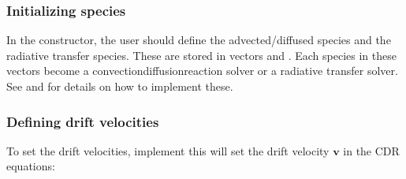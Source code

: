 \documentclass[letterpaper,10pt,english]{sphinxmanual}
\begin{document}
\subsubsection{Initializing species}
\label{\detokenize{Applications/CdrPlasmaModel:initializing-species}}
\sphinxAtStartPar
In the constructor, the user should define the advected/diffused species and the radiative transfer species.
These are stored in vectors  and .
Each species in these vectors become a convection\sphinxhyphen{}diffusion\sphinxhyphen{}reaction solver or a radiative transfer solver.
See {\hyperref[\detokenize{Solvers/CDR:chap-cdrspecies}]{}} and {\hyperref[\detokenize{Solvers/RTE:chap-rtspecies}]{}} for details on how to implement these.


\subsubsection{Defining drift velocities}
\label{\detokenize{Applications/CdrPlasmaModel:defining-drift-velocities}}
\sphinxAtStartPar
To set the drift velocities, implement  \textendash{} this will set the drift velocity \(\mathbf{v}\) in the CDR equations:

\begin{sphinxVerbatim}[commandchars=\\\{\},formatcom=\scriptsize]
           
                                                 
                                                 
                                                
     
\end{sphinxVerbatim}
\end{document}
